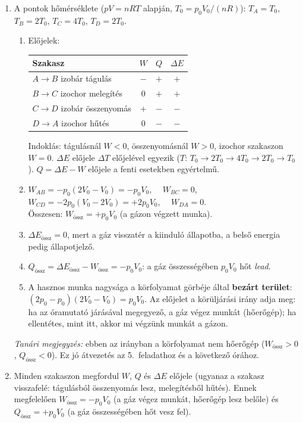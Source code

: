 \documentclass[11pt,a4paper]{article}
\begin{document}
\begin{enumerate}
\item A pontok hőmérséklete ($pV = nRT$ alapján, $T_0 = p_0V_0/(nR)$):
  $T_A = T_0$, $T_B = 2T_0$, $T_C = 4T_0$, $T_D = 2T_0$.
  \begin{enumerate}
    \item Előjelek:
      \begin{center}
      \renewcommand{\arraystretch}{1.3}
      \begin{tabular}{|l|c|c|c|}
      \hline
      Szakasz & $W$ & $Q$ & $\Delta E$ \\ \hline
      $A\to B$ izobár tágulás     & $-$ & $+$ & $+$ \\
      $B\to C$ izochor melegítés  & $0$ & $+$ & $+$ \\
      $C\to D$ izobár összenyomás & $+$ & $-$ & $-$ \\
      $D\to A$ izochor hűtés      & $0$ & $-$ & $-$ \\ \hline
      \end{tabular}
      \end{center}
      Indoklás: tágulásnál $W<0$, összenyomásnál $W>0$, izochor szakaszon $W=0$.
      $\Delta E$ előjele $\Delta T$ előjelével egyezik ($T$: $T_0\to 2T_0\to 4T_0\to
      2T_0\to T_0$). $Q = \Delta E - W$ előjele a fenti esetekben egyértelmű.
    \item $W_{AB} = -p_0(2V_0 - V_0) = -p_0V_0$, $\quad W_{BC} = 0$,\\
      $W_{CD} = -2p_0(V_0 - 2V_0) = +2p_0V_0$, $\quad W_{DA} = 0$.\\
      Összesen: $W_\text{össz} = +p_0V_0$ (a gázon végzett munka).
    \item $\Delta E_\text{össz} = 0$, mert a gáz visszatér a kiinduló állapotba, a belső
      energia pedig állapotjelző.
    \item $Q_\text{össz} = \Delta E_\text{össz} - W_\text{össz} = -p_0V_0$: a gáz
      összességében $p_0V_0$ hőt \emph{lead}.
    \item A hasznos munka nagysága a körfolyamat görbéje által \textbf{bezárt terület}:
      $(2p_0 - p_0)(2V_0 - V_0) = p_0V_0$. Az előjelet a körüljárási irány adja meg: ha az
      óramutató járásával megegyező, a gáz végez munkát (hőerőgép); ha ellentétes, mint
      itt, akkor mi végzünk munkát a gázon.
  \end{enumerate}
  \emph{Tanári megjegyzés:} ebben az irányban a körfolyamat nem hőerőgép ($W_\text{össz}
  > 0$, $Q_\text{össz} < 0$). Ez jó átvezetés az 5.~feladathoz és a következő órához.

\item Minden szakaszon megfordul $W$, $Q$ és $\Delta E$ előjele (ugyanaz a szakasz
  visszafelé: tágulásból összenyomás lesz, melegítésből hűtés). Ennek megfelelően
  $W_\text{össz} = -p_0V_0$ (a gáz végez munkát, hőerőgép lesz belőle) és $Q_\text{össz} =
  +p_0V_0$ (a gáz összességében hőt vesz fel).


\end{enumerate}
\end{document}
